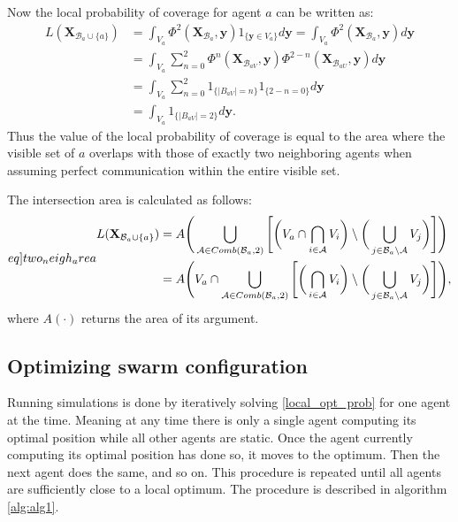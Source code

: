 Now the local probability of coverage for agent $a$ can be written as:
\begin{equation}
  \begin{split}
    L(\mathbf{X}_{\mathcal{B}_{a}\cup\{a\}}) &= \int_{V_{a}}\Phi^{2}(\mathbf{X}_{\mathcal{B}_{a}}, \mathbf{y})1_{\{\mathbf{y}\in V_{a}\}}d\mathbf{y} = \int_{V_{a}}\Phi^{2}(\mathbf{X}_{\mathcal{B}_{a}}, \mathbf{y})d\mathbf{y}\\
    &= \int_{V_{a}}\sum_{n = 0}^{2} \Phi^{n}(\mathbf{X}_{\mathcal{B}_{a V}}, \mathbf{y})\Phi^{2-n}(\mathbf{X}_{\mathcal{B}_{a U}},\mathbf{y})d\mathbf{y}\\
    &= \int_{V_{a}}\sum_{n = 0}^{2}1_{\{|B_{a V}| = n\}}1_{\{2-n = 0\}}d\mathbf{y}\\
    &= \int_{V_{a}}1_{\{|B_{a V}| = 2\}}d\mathbf{y}.
  \end{split}
\end{equation}
Thus the value of the local probability of coverage is equal to the area where the visible set of $a$ overlaps with those of exactly two neighboring agents when assuming perfect communication within the entire visible set.

The intersection area is calculated as follows:
\begin{equation}\label[eq]{two_neigh_area}
  \begin{split}
    L(\mathbf{X}_{\mathcal{B}_{a}\cup\{a\}}) &= A\Biggr(\bigcup_{\mathcal{A}\in Comb(\mathcal{B}_{a}, 2)}\Bigg[\bigg(V_{a}\cap \bigcap_{i\in\mathcal{A}}V_{i}\bigg)\setminus\bigg(\bigcup_{j\in\mathcal{B}_{a}\setminus\mathcal{A}}V_{j}\bigg)\Bigg]\Biggr)\\
    &= A\Biggr(V_{a}\cap\bigcup_{\mathcal{A}\in Comb(\mathcal{B}_{a}, 2)}\Bigg[\bigg(\bigcap_{i\in\mathcal{A}}V_{i}\bigg)\setminus\bigg(\bigcup_{j\in\mathcal{B}_{a}\setminus\mathcal{A}}V_{j}\bigg)\Bigg]\Biggr),
  \end{split}
\end{equation}
where $A(\cdot)$ returns the area of its argument.
\subsection{Optimizing swarm configuration}
Running simulations is done by iteratively solving \eqref{local_opt_prob} for one agent at the time. Meaning at any time there is only
a single agent computing its optimal position while all other agents are static. Once the agent currently computing its optimal position
has done so, it moves to the optimum. Then the next agent does the same, and so on. This procedure is repeated
until all agents are sufficiently close to a local optimum. The procedure is described in algorithm \ref{alg:alg1}.

